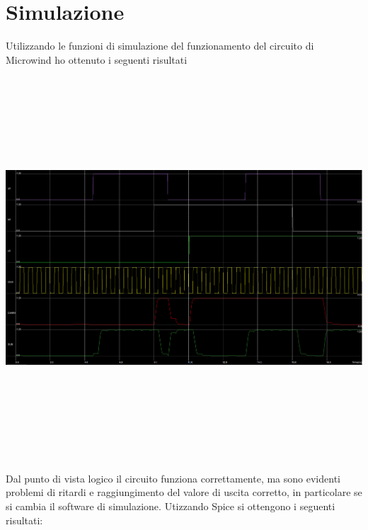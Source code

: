 \documentclass[12pt]{article} %
\begin{document}
\section{Simulazione}
Utilizzando le funzioni di simulazione del funzionamento del circuito di Microwind ho ottenuto i seguenti risultati\\
\includegraphics[width = 160mm, height = 150mm]{plot_microwind_layout1}
Dal punto di vista logico il circuito funziona correttamente, ma sono evidenti problemi di ritardi e raggiungimento del valore di uscita corretto, in particolare se si cambia il software di simulazione.
Utizzando Spice si ottengono i seguenti risultati:
\end{document}
